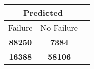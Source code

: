 \begin{tabular} 
 {@{}ccc@{}} 
\toprule 
\multicolumn{2}{c}{\textbf{Predicted}}
 \\ \midrule 
\multicolumn{1}{|c|}{Failure} & 
\multicolumn{1}{c|}{No Failure}
 \\ \midrule 
\multicolumn{1}{|c|}{\color{green}\textbf{88250}} & 
\multicolumn{1}{c|}{\color{red}\textbf{7384}}
 \\ \midrule 
\multicolumn{1}{|c|}{\color{red}\textbf{16388}} & 
\multicolumn{1}{c|}{\color{green}\textbf{58106}}
 \\ \bottomrule 
\end{tabular} 
